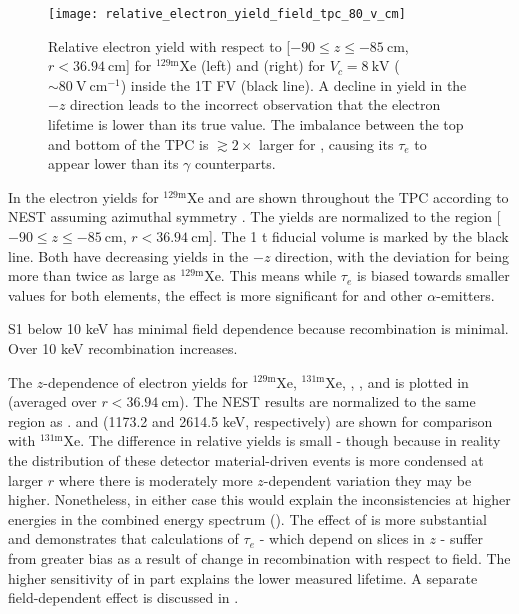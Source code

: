 \begin{figure}
\centering
\texttt{[image: relative\_electron\_yield\_field\_tpc\_80\_v\_cm]}
\caption[Relative electron yield with respect to $\lbrack -90 \leq z \leq -85\ \mathrm{cm}$, $r < 36.94\ \mathrm{cm} \rbrack$ for
$\mathrm{^{129m}Xe}$ and  for $V_c = 8\ \mathrm{kV}$ (${\sim}80\ \mathrm{V\ cm^{-1}}$) inside the 1T FV.]{Relative electron
yield with respect to [$-90 \leq z \leq -85\ \mathrm{cm}$, $r < 36.94\ \mathrm{cm}$] for
$\mathrm{^{129m}Xe}$ (left) and  (right) for $V_c = 8\ \mathrm{kV}$ (${\sim}80\ \mathrm{V\ cm^{-1}}$) inside the 1T FV (black
line).  A decline in yield in the $-z$ direction leads to the incorrect observation that the electron lifetime is lower than its
true value.  The imbalance between the top
and bottom of the TPC is $\gtrsim 2\times$ larger for , causing its $\tau_e$ to appear lower than its $\gamma$ counterparts.}
\label{fig:electron_lifetimes_rn222_vs_kr83m_field_tpc}
\end{figure}

In  the electron yields for $\mathrm{^{129m}Xe}$ and 
are shown throughout the TPC according to NEST assuming azimuthal symmetry .  The yields are normalized to the
region [$-90 \leq z \leq -85\ \mathrm{cm}$,
$r < 36.94\ \mathrm{cm}$].  The 1 t fiducial volume is marked by the black line.  Both have decreasing yields in the $-z$ direction,
with the deviation for  being more than twice as large as $\mathrm{^{129m}Xe}$.  This means while $\tau_e$ is biased towards
smaller values for both elements, the effect is more significant for  and other $\alpha$-emitters.

S1 below 10 keV has minimal field dependence because recombination is minimal.  Over 10 keV recombination increases.

The $z$-dependence of electron yields for $\mathrm{^{129m}Xe}$, $\mathrm{^{131m}Xe}$, , , and  is
plotted in  (averaged over $r < 36.94\ \mathrm{cm}$).  The NEST results are
normalized to the same region as .   and  (1173.2 and
2614.5 keV, respectively) are shown for comparison with $\mathrm{^{131m}Xe}$.  The difference in relative yields is
small - though because in reality the distribution of these detector material-driven events is more condensed at larger $r$ where there
is moderately more $z$-dependent variation they may be higher.  Nonetheless, in either case this
would explain the inconsistencies at higher energies in the combined energy spectrum
().  The
effect of  is more substantial and demonstrates that calculations of $\tau_e$ - which depend on slices in $z$ - suffer from
greater bias as a result of change in recombination with respect to field.  The higher sensitivity of \alphadecays in part explains
the lower measured lifetime.  A separate field-dependent effect is discussed in .

